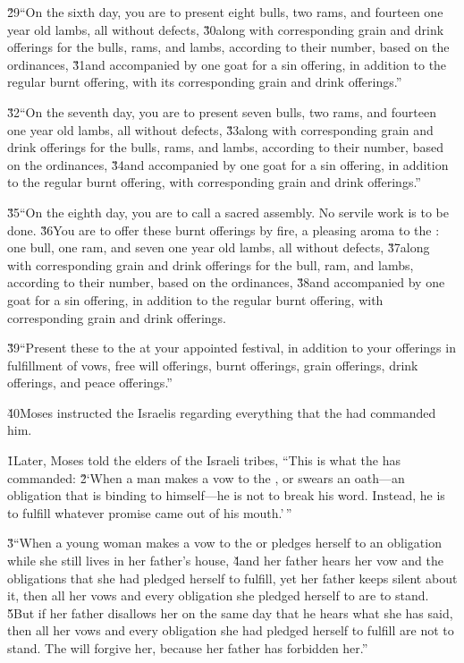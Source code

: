 \v{29}``On the sixth day, you are to present eight bulls, two rams, and fourteen one year old lambs, all without defects, \v{30}along with corresponding grain and drink offerings for the bulls, rams, and lambs, according to their number, based on the ordinances, \v{31}and accompanied by one goat for a sin offering, in addition to the regular burnt offering, with its corresponding grain and drink offerings.''

\v{32}``On the seventh day, you are to present seven bulls, two rams, and fourteen one year old lambs, all without defects, \v{33}along with corresponding grain and drink offerings for the bulls, rams, and lambs, according to their number, based on the ordinances, \v{34}and accompanied by one goat for a sin offering, in addition to the regular burnt offering, with corresponding grain and drink offerings.''

\v{35}``On the eighth day, you are to call a sacred assembly. No servile work is to be done. \v{36}You are to offer these burnt offerings by fire, a pleasing aroma to the : one bull, one ram, and seven one year old lambs, all without defects, \v{37}along with corresponding grain and drink offerings for the bull, ram, and lambs, according to their number, based on the ordinances, \v{38}and accompanied by one goat for a sin offering, in addition to the regular burnt offering, with corresponding grain and drink offerings.

\v{39}``Present these to the  at your appointed festival, in addition to your offerings in fulfillment of vows, free will offerings, burnt offerings, grain offerings, drink offerings, and peace offerings.''

\v{40}Moses instructed the Israelis regarding everything that the  had commanded him.

\v{1}Later, Moses told the elders of the Israeli tribes, ``This is what the  has commanded: \v{2}`When a man makes a vow to the , or swears an oath---an obligation that is binding to himself---he is not to break his word. Instead, he is to fulfill whatever promise came out of his mouth.'\,''

\v{3}``When a young woman makes a vow to the  or pledges herself to an obligation while she still lives in her father's house, \v{4}and her father hears her vow and the obligations that she had pledged herself to fulfill, yet her father keeps silent about it, then all her vows and every obligation she pledged herself to are to stand. \v{5}But if her father disallows her on the same day that he hears what she has said, then all her vows and every obligation she had pledged herself to fulfill are not to stand. The  will forgive her, because her father has forbidden her.''

